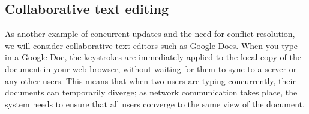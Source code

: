 \subsection{Collaborative text editing}

As another example of concurrent updates and the need for conflict resolution, we will consider collaborative text editors such as Google Docs.
When you type in a Google Doc, the keystrokes are immediately applied to the local copy of the document in your web browser, without waiting for them to sync to a server or any other users.
This means that when two users are typing concurrently, their documents can temporarily diverge; as network communication takes place, the system needs to ensure that all users converge to the same view of the document.

\begin{frame}[plain]
    \label{s:google-docs}
\end{frame}
\label{l:google-docs}


